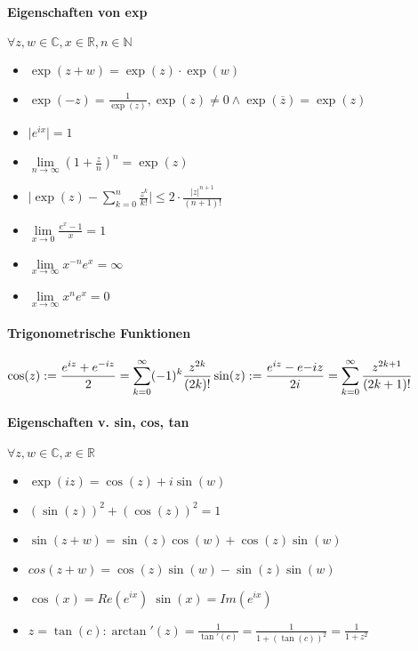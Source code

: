 \documentclass[paper=a4,paper=landscape, fontsize=6pt,DIV=25, twoside]{scrartcl}
\newcommand{\real}{{\mathbb{R}}}
\newcommand{\compl}{\mathbb{C}}
\newcommand{\nat}{\mathbb{N}}
\begin{document}
\begin{multicols*}{4}
		\paragraph{Eigenschaften von exp}
		$\forall z,w \in \compl, x \in \real, n \in \nat$
		\begin{itemize}
			\item $\exp(z+w)=\exp(z)\cdot \exp(w)$
			\item $\exp(-z)=\frac{1}{\exp(z)}, \exp(z) \neq 0 \wedge \exp(\overline{z})=\exp(z)$
			\item $\lvert e^{ix} \rvert = 1$
			\item $\lim\limits_{n \rightarrow \infty} (1+\frac{z}{n})^n=\exp(z)$
			\item $\displaystyle \lvert \exp(z)- \sum_{k=0}^{n} \frac{z^k}{k!} \rvert \leq 2 \cdot \frac{\lvert z \rvert ^{n+1}}{(n+1)!}$
			\item $\displaystyle \lim\limits_{x \rightarrow 0} \frac{e^x-1}{x} = 1$
			\item $\displaystyle \lim\limits_{x \rightarrow \infty} x^{-n}e^x=\infty$
			\item $\displaystyle \lim\limits_{x \rightarrow \infty} x^ne^x=0$
		\end{itemize}
			\paragraph{Trigonometrische Funktionen}
			$ \displaystyle \cos(z):=\frac{e^{iz}+e^{-iz}}{2} = \sum_{k=0}^{\infty} (-1)^k\frac{z^{2k}}{(2k)!}\\\sin(z):=\frac{e^{iz}-e{-iz}}{2i} = \sum_{k=0}^{\infty}\frac{z^{2k+1}}{(2k+1)!}$
			\paragraph{Eigenschaften v. sin, cos, tan}
			$\forall z,w \in \compl, x \in \real$
			
			\begin{itemize}
				\item $\exp(iz) = \cos(z)+i\sin(w)$
				\item $(\sin(z))^2+(\cos(z))^2=1$
				\item $\sin(z+w)=\sin(z)\cos(w)+\cos(z)\sin(w)$
				\item $cos(z+w)=\cos(z)\sin(w)-\sin(z)\sin(w)$
				\item $\cos(x)=Re(e^{ix}) \; \sin(x)=Im(e^{ix})$
				\item $z=\tan(c): \arctan'(z)=\frac{1}{\tan'(c)}=\frac{1}{1+(\tan(c))^2}=\frac{1}{1+z^2}$
			\end{itemize}
		

\end{multicols*}
\end{document}
